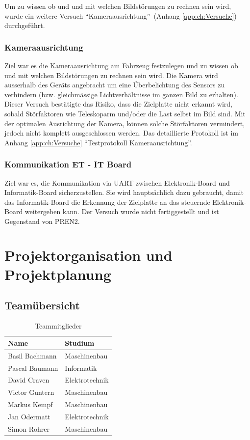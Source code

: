 \documentclass[a4paper]{report}
\begin{document}
Um zu wissen ob und und mit welchen Bildstörungen zu rechnen sein wird, wurde ein weitere Versuch \textquotedblleft Kameraausrichtung\textquotedblright\ (Anhang \ref{app:ch:Versuche}) durchgeführt.

\subsection{Kameraausrichtung}
\label{ssec:VersKamera}
Ziel war es die Kameraausrichtung am Fahrzeug festzulegen und zu wissen ob und mit welchen Bildstörungen zu rechnen sein wird.
Die Kamera wird ausserhalb des Geräts angebracht um eine Überbelichtung des Sensors zu verhindern (bzw. gleichmässige Lichtverhältnisse im ganzen Bild zu erhalten).
Dieser Versuch bestätigte das Risiko, dass die Zielplatte nicht erkannt wird, sobald Störfaktoren wie Teleskoparm und/oder die Last selbst im Bild sind.  Mit der optimalen Ausrichtung der Kamera, können solche Störfaktoren vermindert, jedoch nicht komplett ausgeschlossen werden. Das detaillierte Protokoll ist im Anhang \ref{app:ch:Versuche}  \textquotedblleft Testprotokoll Kameraausrichtung\textquotedblright.

\subsection{Kommunikation ET - IT Board}
\label{ssec:VersKomm}
Ziel war es, die Kommunikation via UART zwischen Elektronik-Board und Informatik-Board sicherzustellen. Sie wird hauptsächlich dazu gebraucht, damit das Informatik-Board die Erkennung der Zielplatte an das steuernde Elektronik-Board weitergeben kann. Der Versuch wurde nicht fertiggestellt und ist Gegenstand von PREN2.

\chapter{Projektorganisation und Projektplanung}
\label{ch:ProjektOrga}

\section{Teamübersicht}
\label{sec:Teamuebersicht}
\begin{table}[h!]
	\centering
	\begin{tabular}{|p{}|p{}|}
		\hline
		\textbf{Name} & \textbf{Studium} \\
		\hline
		Basil Bachmann & Maschinenbau \\
		\hline
		Pascal Baumann & Informatik \\
		\hline
		David Craven & Elektrotechnik \\
		\hline
		Victor Guntern & Maschinenbau \\
		\hline
		Markus Kempf & Maschinenbau \\
		\hline
		Jan Odermatt & Elektrotechnik \\
		\hline
		Simon Rohrer & Maschinenbau \\
		\hline
	\end{tabular}
	\caption{Teammitglieder}
	\label{tab:TeamMitglieder}
\end{table}
\end{document}
